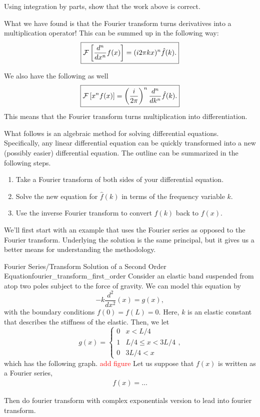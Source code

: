 \begin{exercise}
	Using integration by parts, show that the work above is correct. 
\end{exercise}

What we have found is that the Fourier transform turns derivatives into a multiplication operator! This can be summed up in the following way:
\[
\boxed{\mathcal{F}\left[ \frac{d^n}{dx^n} f(x) \right] = (i2\pi kx)^n \hat{f}(k).}
\]

We also have the following as well
\[
\boxed{\mathcal{F}\left[ x^n f(x) \right] = \left(\frac{i}{2\pi}\right)^n \frac{d^n}{dk^n} \hat{f}(k).}
\]
This means that the Fourier transform turns multiplication into differentiation.  

What follows is an algebraic method for solving differential equations. Specifically, any linear differential equation can be quickly transformed into a new (possibly easier) differential equation. The outline can be summarized in the following steps.
\begin{enumerate}[1.]
	\item Take a Fourier transform of both sides of your differential equation.
	\item Solve the new equation for $\hat{f}(k)$ in terms of the frequency variable $k$.
	\item Use the inverse Fourier transform to convert $\hat{f}(k)$ back to $f(x)$.
\end{enumerate}

We'll first start with an example that uses the Fourier series as opposed to the Fourier transform.  Underlying the solution is the same principal, but it gives us a better means for understanding the methodology.

\begin{ex}{Fourier Series/Transform Solution of a Second Order Equation}{fourier_transform_first_order}
	Consider an elastic band suspended from atop two poles subject to the force of gravity. We can model this equation by
	\[
	-k\frac{d^2}{dx^2}(x) = g(x),
	\]
	with the boundary conditions $f(0)=f(L)=0$. Here, $k$ is an elastic constant that describes the stiffness of the elastic.  Then, we let 
	\[
	g(x) = \begin{cases} 0 & x<L/4 \\ 1 & L/4 \leq x < 3L/4 \\ 0 & 3L/4<x \end{cases},
	\]
	which has the following graph.
	\textcolor{red}{add figure}
	Let us suppose that $f(x)$ is written as a Fourier series,
	\begin{align*}
		f(x) = ...
	\end{align*}
	
	Then do fourier transform with complex exponentials version to lead into fourier transform. 
	
\end{ex}
	

